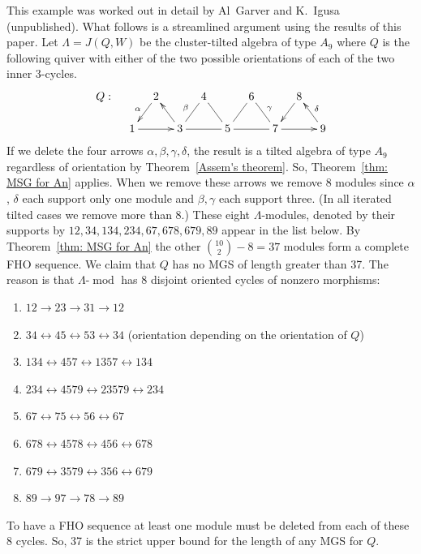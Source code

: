 \documentclass[ALCO,ThmDefs,Unicode,epreuves]{cedram}
\DeclareMathOperator{\modr}{mod}
\begin{document}
\begin{exam}\label{eg: Garver and I}
This example was worked out in detail by Al~Garver and K.~Igusa (unpublished). What follows is a streamlined argument using the results of this paper.
Let $\Lambda=J(Q,W)$ be the cluster-tilted algebra of type $A_9$ where $Q$ is the following quiver with either of the two possible orientations of each of the two inner 3-cycles.
\[
\xymatrixrowsep{15pt}\xymatrixcolsep{10pt}
\xymatrix{%
Q:&& 2\ar[dl]_{\alpha} && 4 && 6 &&8\ar[dl]\\
&1\ar[rr] &&3\ar[lu]\ar@{-}[ru]^\beta\ar@{-}[rr]&& 5\ar@{-}[ru]\ar@{-}[rr]\ar@{-}[lu] && 7\ar[rr]\ar@{-}[lu]_\gamma && 9\ar[lu]_\delta
	}%
\]
If we delete the four arrows $\alpha,\beta,\gamma,\delta$, the result is a tilted algebra of type $A_9$ regardless of orientation by Theorem~\ref{Assem's theorem}. So, Theorem~\ref{thm: MSG for An} applies. When we remove these arrows we remove 8 modules since $\alpha$, $\delta$ each support only one module and $\beta,\gamma$ each support three. (In all iterated tilted cases we remove more than 8.) These eight $\Lambda$-modules, denoted by their supports by $12,34,134,234,67,678,679,89$ appear in the list below. By Theorem~\ref{thm: MSG for An} the other $\binom{10}2-8=37$ modules form a complete FHO sequence. We claim that $Q$ has no MGS of length greater than 37. The reason is that $\Lambda\text{-}\modr $ has 8 disjoint oriented cycles of nonzero morphisms: 
\begin{enumerate}
\item $12\to 23\to 31\to 12$
\item $34 \leftrightarrow 45 \leftrightarrow 53 \leftrightarrow 34$ (orientation depending on the orientation of $Q$)
\item $134 \leftrightarrow 457\leftrightarrow 1357\leftrightarrow 134$
\item $234\leftrightarrow 4579 \leftrightarrow 23579\leftrightarrow234$
\item $ 67\leftrightarrow75\leftrightarrow56\leftrightarrow67$
\item $678\leftrightarrow 4578\leftrightarrow456\leftrightarrow678$
\item $679\leftrightarrow3579\leftrightarrow356\leftrightarrow679$
\item $89\to 97\to 78\to 89$
\end{enumerate}
To have a FHO sequence at least one module must be deleted from each of these 8 cycles. So, 37 is the strict upper bound for the length of any MGS for $Q$.
\end{exam}
\end{document}
